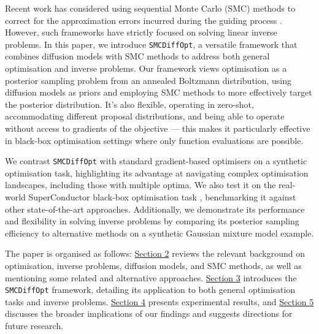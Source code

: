 Recent work has considered using sequential Monte Carlo (SMC) methods
\parencite{chopinIntroductionSequentialMonte2020} to correct for the approximation errors incurred
during the guiding process
\parencite{trippeDiffusionProbabilisticModeling2023,cardosoMonteCarloGuided2023,douDiffusionPosteriorSampling2023,wuPracticalAsymptoticallyExact2023}.
However, such frameworks have strictly focused on solving linear inverse problems.
In this paper, we introduce \texttt{SMCDiffOpt}, a versatile framework that combines diffusion models
with SMC methods to address both general optimisation and inverse problems. Our framework views
optimisation as a posterior sampling problem from an annealed Boltzmann distribution, using
diffusion models as priors and employing SMC methods to more effectively target the posterior
distribution. It's also flexible, operating in zero-shot, accommodating different proposal
distributions, and being able to operate without access to gradients of the objective --- this makes
it particularly effective in black-box optimisation settings where only function evaluations are
possible.

We contrast \texttt{SMCDiffOpt} with standard gradient-based optimisers on a synthetic optimisation
task, highlighting its advantage at navigating complex optimisation landscapes, including those
with multiple optima. We also test it on the real-world SuperConductor black-box optimisation task
\parencite{trabuccoDesignBenchBenchmarksDataDriven2022}, benchmarking it against other
state-of-the-art approaches. Additionally, we demonstrate its performance and flexibility in solving
inverse problems by comparing its posterior sampling efficiency to alternative methods on a
synthetic Gaussian mixture model example.

The paper is organised as follows: \hyperref[chap:background]{Section 2} reviews the relevant
background on optimisation, inverse problems, diffusion models, and SMC methods, as well as
mentioning some related and alternative approaches. \hyperref[chap:methods]{Section 3} introduces
the \texttt{SMCDiffOpt} framework, detailing its application to both general optimisation tasks and
inverse problems.  \hyperref[chap:experiments]{Section 4} presents experimental results, and
\hyperref[chap:discussion]{Section 5} discusses the broader implications of our findings and
suggests directions for future research.
